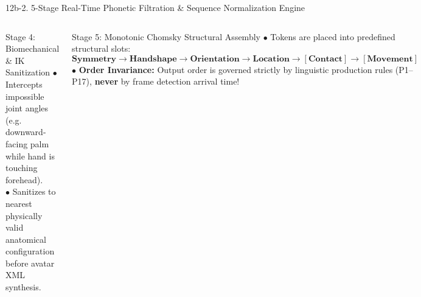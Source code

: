 \documentclass[aspectratio=169,xcolor={table,dvipsnames}]{beamer}
\begin{document}
\begin{frame}[t]{12b-2. 5-Stage Real-Time Phonetic Filtration \& Sequence Normalization Engine}
\begin{columns}[T]
    \begin{block}{Stage 4: Biomechanical \& IK Sanitization}
        \fontsize{6.6pt}{8.4pt}\selectfont
        $\bullet$ Intercepts impossible joint angles (e.g. downward-facing palm while hand is touching forehead).\\
        $\bullet$ Sanitizes to nearest physically valid anatomical configuration before avatar XML synthesis.
    \end{block}

    \begin{block}{Stage 5: Monotonic Chomsky Structural Assembly}
        \fontsize{6.6pt}{8.4pt}\selectfont
        $\bullet$ Tokens are placed into predefined structural slots:
        $$\mathbf{\text{Symmetry} \to \text{Handshape} \to \text{Orientation} \to \text{Location} \to [\text{Contact}] \to [\text{Movement}]}$$
        $\bullet$ \textbf{Order Invariance:} Output order is governed strictly by linguistic production rules (P1--P17), \textbf{never} by frame detection arrival time!
    \end{block}
\end{columns}
\end{frame}
\end{document}
